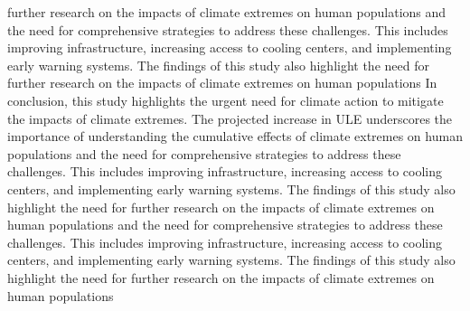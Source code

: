 \documentclass[9pt, twoside]{extarticle}
\begin{document}
\begin{maintext}
further research on the impacts of climate extremes on human populations and the need for comprehensive strategies to address these challenges. This includes improving infrastructure, increasing access to cooling centers, and implementing early warning systems.\cite{IPCC2021} The findings of this study also highlight the need for further research on the impacts of climate extremes on human populations  In conclusion, this study highlights the urgent need for climate action to mitigate the impacts of climate extremes. The projected increase in ULE underscores the importance of understanding the cumulative effects of climate extremes on human populations and the need for comprehensive strategies to address these challenges. This includes improving infrastructure, increasing access to cooling centers, and implementing early warning systems.\cite{IPCC2021} The findings of this study also highlight the need for further research on the impacts of climate extremes on human populations and the need for comprehensive strategies to address these challenges. This includes improving infrastructure, increasing access to cooling centers, and implementing early warning systems.\cite{IPCC2021} The findings of this study also highlight the need for further research on the impacts of climate extremes on human populations  
\end{maintext}

\fontacknowledgment



\end{document}
